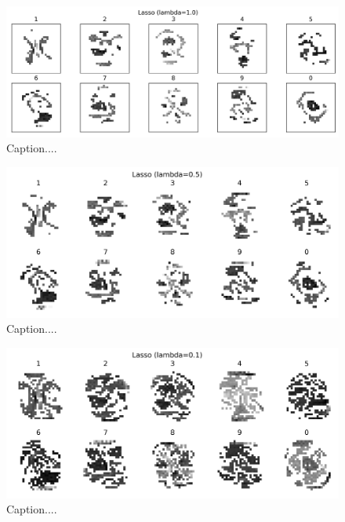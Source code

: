 \documentclass[10pt]{article}
\begin{document}
\begin{figure}[ht]
\centerline{\includegraphics[scale=0.75]{figures/weight_matrix_lasso_1_no_zeros.png}}
\caption{Caption....}
\label{fig10}
\end{figure}

\begin{figure}[ht]
\centerline{\includegraphics[scale=0.75]{figures/weight_matrix_lasso_05_no_zeros.png}}
\caption{Caption....}
\label{fig11}
\end{figure}

\begin{figure}[ht]
\centerline{\includegraphics[scale=0.75]{figures/weight_matrix_lasso_01_no_zeros.png}}
\caption{Caption....}
\label{fig12}
\end{figure}
\end{document}

